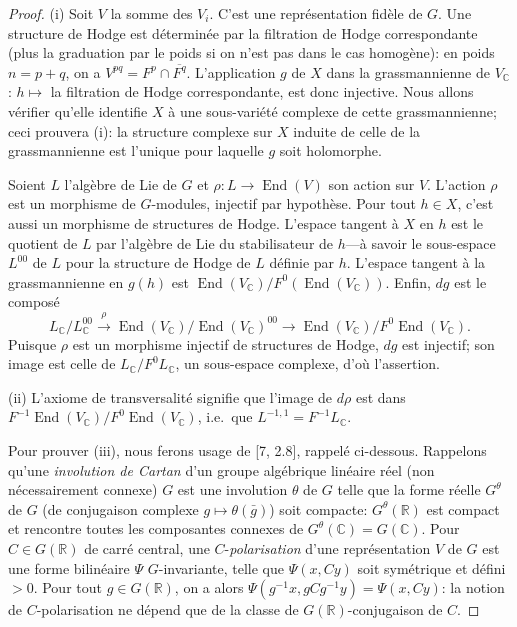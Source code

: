 \documentclass[12pt,a4paper]{article}
\theoremstyle{plain}
\theoremstyle{definition}
\theoremstyle{remark}
\DeclareMathOperator{\End}{End}
\newcommand{\RR}{\mathbb{R}}
\newcommand{\CC}{\mathbb{C}}
\begin{document}
\begin{proof}
(i) Soit $V$ la somme des $V_i$. C'est une repr\'esentation fid\`ele de $G$. Une structure de Hodge est d\'etermin\'ee par la filtration de Hodge correspondante (plus la graduation par le poids si on n'est pas dans le cas homog\`ene): en poids $n = p+q$, on a $V^{pq} = F^p \cap \overline{F^q}$. L'application $g$ de $X$ dans la grassmannienne de $V_{\CC}$: $h \mapsto$ la filtration de Hodge correspondante, est donc injective. Nous allons v\'erifier qu'elle identifie $X$ \`a une sous-vari\'et\'e complexe de cette grassmannienne; ceci prouvera (i): la structure complexe sur $X$ induite de celle de la grassmannienne est l'unique pour laquelle $g$ soit holomorphe.

Soient $L$ l'alg\`ebre de Lie de $G$ et $\rho:L \to \End(V)$ son action sur $V$. L'action $\rho$ est un morphisme de $G$-modules, injectif par hypoth\`ese. Pour tout $h \in X$, c'est aussi un morphisme de structures de Hodge. L'espace tangent \`a $X$ en $h$ est le quotient de $L$ par l'alg\`ebre de Lie du stabilisateur de $h$---\`a savoir le sous-espace $L^{00}$ de $L$ pour la structure de Hodge de $L$ d\'efinie par $h$. L'espace tangent \`a la grassmannienne en $g(h)$ est $\End(V_{\CC})/F^0(\End(V_{\CC}))$. Enfin, $dg$ est le compos\'e
\[
L_{\CC}/L^{00}_{\CC} \xrightarrow{\rho} \End(V_{\CC})/\End(V_{\CC})^{00} \to \End(V_{\CC})/F^0\End(V_{\CC}).
\]
Puisque $\rho$ est un morphisme injectif de structures de Hodge, $dg$ est injectif; son image est celle de $L_{\CC}/F^0L_{\CC}$, un sous-espace complexe, d'o\`u l'assertion.

(ii) L'axiome de transversalit\'e signifie que l'image de $d\rho$ est dans $F^{-1}\End(V_{\CC})/F^0\End(V_{\CC})$, i.e.~que $L^{-1,1} = F^{-1}L_{\CC}$.

Pour prouver (iii), nous ferons usage de [7, 2.8], rappel\'e ci-dessous. Rappelons qu'une \textit{involution de Cartan} d'un groupe alg\'ebrique lin\'eaire r\'eel (non n\'ecessairement connexe) $G$ est une involution $\theta$ de $G$ telle que la forme r\'eelle $G^{\theta}$ de $G$ (de conjugaison complexe $g \mapsto \theta(\bar{g})$) soit compacte: $G^{\theta}(\RR)$ est compact et rencontre toutes les composantes connexes de $G^{\theta}(\CC) = G(\CC)$. Pour $C \in G(\RR)$ de carr\'e central, une $C$-\textit{polarisation} d'une repr\'esentation $V$ de $G$ est une forme bilin\'eaire $\Psi$ $G$-invariante, telle que $\Psi(x,Cy)$ soit sym\'etrique et d\'efini $>0$. Pour tout $g \in G(\RR)$, on a alors $\Psi(g^{-1}x, gCg^{-1}y) = \Psi(x,Cy)$: la notion de $C$-polarisation ne d\'epend que de la classe de $G(\RR)$-conjugaison de $C$.
\end{proof}
\end{document}
